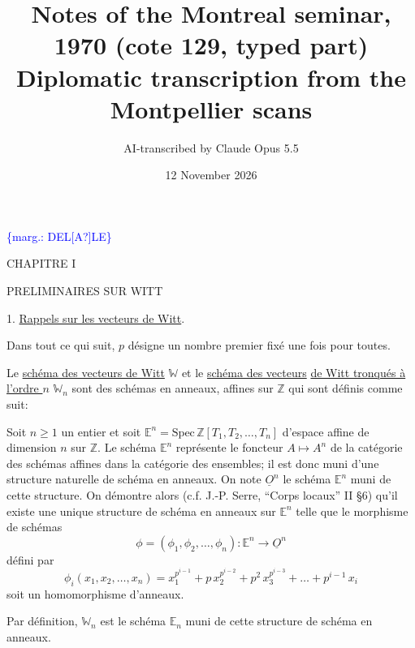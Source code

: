 \documentclass[11pt]{article}
\title{Notes of the Montreal seminar, 1970 (cote 129, typed part)\\[4pt]\large Diplomatic transcription from the Montpellier scans}
\author{AI-transcribed by Claude Opus 5.5}
\date{12 November 2026}
\newcommand{\scanpage}[1]{\par\bigskip\noindent{\small\sffamily[scan #1]}\par}
\newcommand{\mspage}[1]{{\small\sffamily[p.\,#1]}}
\newcommand{\hand}[1]{\textcolor{blue}{#1}}
\newcommand{\margin}[1]{\textcolor{blue}{\{\textsf{marg.:} #1\}}}
\newcommand{\uline}[1]{\underline{#1}}
\newcommand{\unsure}[1]{[#1?]}
\begin{document}
\maketitle

\scanpage{129/1}
\margin{DEL\unsure{A}LE}

CHAPITRE I

PRELIMINAIRES SUR WITT

\mspage{\hand{1}}

\clearpage
\scanpage{129/2}
1.  \uline{Rappels sur les vecteurs de Witt}.

Dans tout ce qui suit, $p$  désigne un nombre premier fixé
une fois pour toutes.

Le \uline{schéma des vecteurs de Witt} $\mathbb{W}$  et le \uline{schéma des vecteurs}
\uline{de Witt tronqués à l'ordre  $n$} $\mathbb{W}_n$  sont des schémas en anneaux, affines
sur $\mathbb{Z}$ qui sont définis comme suit:

Soit  $n \geq 1$  un entier et soit  $\mathbb{E}^n = \mathrm{Spec}\, \mathbb{Z}[T_1,T_2,\dots,T_n]$
d'espace affine de dimension  $n$  sur  $\mathbb{Z}$.  Le schéma  $\mathbb{E}^n$  représente
le foncteur  $A \mapsto A^n$  de la catégorie des schémas affines dans la
catégorie des ensembles; il est donc muni d'une structure naturelle de
schéma en anneaux.  On note  $\underline{O}^n$  le schéma  $\mathbb{E}^n$  muni de cette structure.
On démontre alors (c.f. J.-P. Serre, ``Corps locaux'' II §6) qu'il existe
une unique structure de schéma en anneaux sur  $\mathbb{E}^n$  telle que le morphisme
de schémas
\[
\phi = (\phi_1,\phi_2,\dots,\phi_n) \colon \mathbb{E}^n \to \underline{O}^n
\]
défini par
\[
\phi_i(x_1,x_2,\dots,x_n) = x_1^{p^{i-1}} + p\, x_2^{p^{i-2}} + p^2\, x_3^{p^{i-3}} + \dots + p^{i-1}\, x_i
\]
soit un homomorphisme d'anneaux.

Par définition, $\mathbb{W}_n$  est le schéma  $\mathbb{E}_n$  muni de cette structure
de schéma en anneaux.
\end{document}
